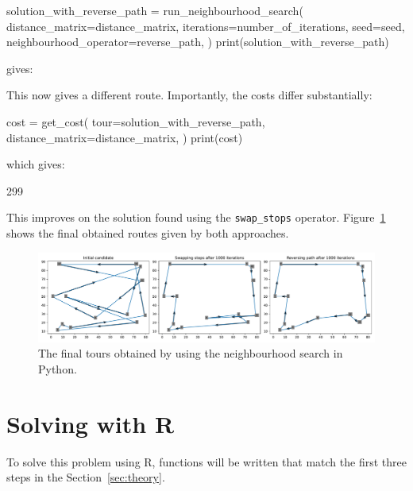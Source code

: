 \begin{pyin}
solution_with_reverse_path = run_neighbourhood_search(
    distance_matrix=distance_matrix,
    iterations=number_of_iterations,
    seed=seed,
    neighbourhood_operator=reverse_path,
)
print(solution_with_reverse_path)
\end{pyin}

gives:

\begin{pyout}
[0, 8, 5, 3, 1, 9, 12, 11, 4, 10, 6, 2, 7, 0]
\end{pyout}

This now gives a different route.
Importantly, the costs differ substantially:

\begin{pyin}
cost = get_cost(
    tour=solution_with_reverse_path,
    distance_matrix=distance_matrix,
)
print(cost)
\end{pyin}

which gives:

\begin{pyout}
299
\end{pyout}

This improves on the solution found using the \texttt{swap_stops}
operator. Figure~\ref{fig:final-tsp-tours-python} shows the final obtained
routes given by both approaches.

\begin{figure}
    \begin{center}
        \includegraphics[width=\textwidth]{./assets/final-tsp-tours-with-python/main.pdf}
    \end{center}
    \caption{The final tours obtained by using the neighbourhood search in
    Python.}
    \label{fig:final-tsp-tours-python}
\end{figure}



\section{Solving with R}\label{sec:solving-with-R}

To solve this problem using R, functions will be written that match the
first three steps in the Section~\ref{sec:theory}.

